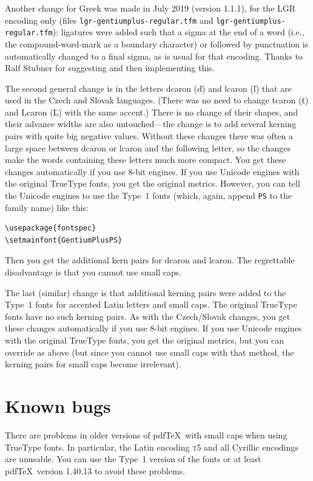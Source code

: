 \documentclass[12pt, english]{article}
\def\pdfTeX{pdf{\TeX}}
\begin{document}
Another change for Greek was made in July 2019 (version 1.1.1),
for the LGR encoding only (files \verb|lgr-gentiumplus-regular.tfm| and
\verb|lgr-gentiumplus-regular.tfm|): ligatures were added such that a
sigma at the end of a word (i.e., the compound-word-mark as a boundary
character) or followed by punctuation is automatically changed to a
final sigma, as is usual for that encoding. Thanks to Ralf Stubner for
suggesting and then implementing this.

The second general change is in the letters dcaron (ď) and lcaron
(ľ) that are used in the Czech and Slovak languages. (There was
no need to change tcaron (ť) and Lcaron (Ľ) with the same
accent.) There is no change of their shapes, and their advance widths
are also untouched---the change is to add several kerning pairs with
quite big negative values. Without these changes there was often a large
space between dcaron or lcaron and the following letter, so the changes
make the words containing these letters much more compact. You get these
changes automatically if you use 8-bit engines.  If you use Unicode
engines with the original TrueType fonts, you get the original
metrics. However, you can tell the Unicode engines to use the Type~1
fonts (which, again, append \verb|PS| to the family name) like this:
\begin{verbatim}
\usepackage{fontspec}
\setmainfont{GentiumPlusPS}
\end{verbatim}
Then you get the additional kern pairs for dcaron and lcaron. The
regrettable disadvantage is that you cannot use small caps.

The last (similar) change is that additional kerning pairs were added to
the Type~1 fonts for accented Latin letters and small caps. The original
TrueType fonts have no such kerning pairs. As with the Czech/Slovak
changes, you get these changes automatically if you use 8-bit
engines. If you use Unicode engines with the original TrueType fonts,
you get the original metrics, but you can override as above (but since
you cannot use small caps with that method, the kerning pairs for small
caps become irrelevant).


\section{Known bugs}

There are problems in older versions of \pdfTeX\ with small caps when
using TrueType fonts.  In particular, the Latin encoding \textsc{t5} and all
Cyrillic encodings are unusable.  You can use the Type~1 version of the
fonts or at least \pdfTeX\ version 1.40.13 to avoid these problems.
\end{document}
